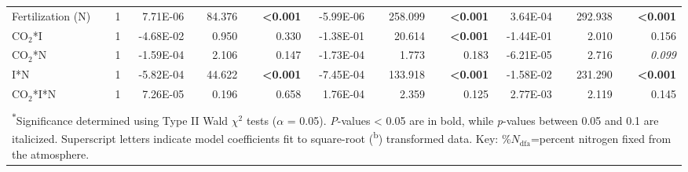 \begin{landscape}
\begin{table}[]
{\begin{tabular}{p{3.5cm}p{0.5cm}p{1.75cm}p{1.5cm}p{1.5cm}p{1.75cm}p{1.5cm}p{1.5cm}p{1.75cm}p{1.5cm}p{1.5cm}}
            Fertilization (N) & \multicolumn{1}{r}{1}
            & \multicolumn{1}{r}{7.71E-06}      & \multicolumn{1}{r}{84.376}        & \multicolumn{1}{r}{\textbf{<0.001}}
            & \multicolumn{1}{r}{-5.99E-06}     & \multicolumn{1}{r}{258.099}       & \multicolumn{1}{r}{\textbf{<0.001}}
            & \multicolumn{1}{r}{3.64E-04}      & \multicolumn{1}{r}{292.938}       & \multicolumn{1}{r}{\textbf{<0.001}} 
            \\

            CO$_2$*I & \multicolumn{1}{r}{1}
            & \multicolumn{1}{r}{-4.68E-02}     & \multicolumn{1}{r}{0.950}         & \multicolumn{1}{r}{0.330}
            & \multicolumn{1}{r}{-1.38E-01}     & \multicolumn{1}{r}{20.614}        & \multicolumn{1}{r}{\textbf{<0.001}}
            & \multicolumn{1}{r}{-1.44E-01}     & \multicolumn{1}{r}{2.010}         & \multicolumn{1}{r}{0.156} 
            \\

            CO$_2$*N & \multicolumn{1}{r}{1}
            & \multicolumn{1}{r}{-1.59E-04}     & \multicolumn{1}{r}{2.106}         & \multicolumn{1}{r}{0.147}
            & \multicolumn{1}{r}{-1.73E-04}     & \multicolumn{1}{r}{1.773}         & \multicolumn{1}{r}{0.183}
            & \multicolumn{1}{r}{-6.21E-05}     & \multicolumn{1}{r}{2.716}         & \multicolumn{1}{r}{\textit{0.099}} 
            \\

            I*N & \multicolumn{1}{r}{1}
            & \multicolumn{1}{r}{-5.82E-04}     & \multicolumn{1}{r}{44.622}        & \multicolumn{1}{r}{\textbf{<0.001}}
            & \multicolumn{1}{r}{-7.45E-04}     & \multicolumn{1}{r}{133.918}       & \multicolumn{1}{r}{\textbf{<0.001}}
            & \multicolumn{1}{r}{-1.58E-02}     & \multicolumn{1}{r}{231.290}       & \multicolumn{1}{r}{\textbf{<0.001}} 
            \\

            CO$_2$*I*N & \multicolumn{1}{r}{1}
            & \multicolumn{1}{r}{7.26E-05}      & \multicolumn{1}{r}{0.196}         & \multicolumn{1}{r}{0.658}
            & \multicolumn{1}{r}{1.76E-04}      & \multicolumn{1}{r}{2.359}         & \multicolumn{1}{r}{0.125}
            & \multicolumn{1}{r}{2.77E-03}      & \multicolumn{1}{r}{2.119}         & \multicolumn{1}{r}{0.145} 
            \\
            \hline
            \\
            \multicolumn{11}{p{22.5cm}}{\textsuperscript{$*$}Significance determined using Type II Wald $\chi^{2}$ tests ($\alpha$ = 0.05). \textit{P}-values < 0.05 are in bold, while \textit{p}-values between 0.05 and 0.1 are italicized. Superscript letters indicate model coefficients fit to square-root (\textsuperscript{b}) transformed data. Key: \%$N_\mathrm{dfa}$=percent nitrogen fixed from the atmosphere.}
    \end{tabular}}
    \label{tab:table5.5}
    \end{table}
\end{landscape}
\clearpage


